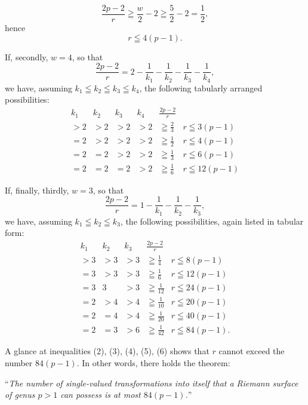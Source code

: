 \documentclass{article}
\begin{document}
\[
\frac{2p - 2}{r} \geqq \frac{w}{2} - 2 \geqq \frac{5}{2} - 2 = \frac{1}{2},
\]
hence
\[
r \leqq 4(p - 1).
\tag{4}
\]

If, secondly, $w = 4$, so that
\[
\frac{2p - 2}{r} = 2 - \frac{1}{k_1} - \frac{1}{k_2} - \frac{1}{k_3} - \frac{1}{k_4},
\]
we have, assuming $k_1 \leqq k_2 \leqq k_3 \leqq k_4$, the following tabularly arranged possibilities:
\[
\begin{array}{c|c|c|c|c|c}
\hline\hline
k_1 & k_2 & k_3 & k_4 & \frac{2p - 2}{r} & \\
\hline
> 2 & > 2 & > 2 & > 2 & \geqq \frac{2}{3} & r \leqq 3(p - 1) \\
\hline
= 2 & > 2 & > 2 & > 2 & \geqq \frac{1}{2} & r \leqq 4(p - 1) \\
\hline
= 2 & = 2 & > 2 & > 2 & \geqq \frac{1}{3} & r \leqq 6(p - 1) \\
\hline
= 2 & = 2 & = 2 & > 2 & \geqq \frac{1}{6} & r \leqq 12(p - 1)
\end{array}
\tag{5}
\]

If, finally, thirdly, $w = 3$, so that
\[
\frac{2p - 2}{r} = 1 - \frac{1}{k_1} - \frac{1}{k_2} - \frac{1}{k_3},
\]
we have, assuming $k_1 \leqq k_2 \leqq k_3$, the following possibilities, again listed in tabular form:
\[
\begin{array}{c|c|c|c|c}
\hline\hline
k_1 & k_2 & k_3 & \frac{2p - 2}{r} & \\
\hline
> 3 & > 3 & > 3 & \geqq \frac{1}{4} & r \leqq 8(p - 1) \\
\hline
= 3 & > 3 & > 3 & \geqq \frac{1}{6} & r \leqq 12(p - 1) \\
\hline
= 3 & 3 & > 3 & \geqq \frac{1}{12} & r \leqq 24(p - 1) \\
\hline
= 2 & > 4 & > 4 & \geqq \frac{1}{10} & r \leqq 20(p - 1) \\
\hline
= 2 & = 4 & > 4 & \geqq \frac{1}{20} & r \leqq 40(p - 1) \\
\hline
= 2 & = 3 & > 6 & \geqq \frac{1}{42} & r \leqq 84(p - 1).
\end{array}
\tag{6}
\]

A glance at inequalities (2), (3), (4), (5), (6) shows that $r$ cannot exceed the number $84(p - 1)$. In other words, there holds the theorem:

``\emph{The number of single-valued transformations into itself that a Riemann surface of genus $p > 1$ can possess is at most $84(p - 1)$.}''
\end{document}
